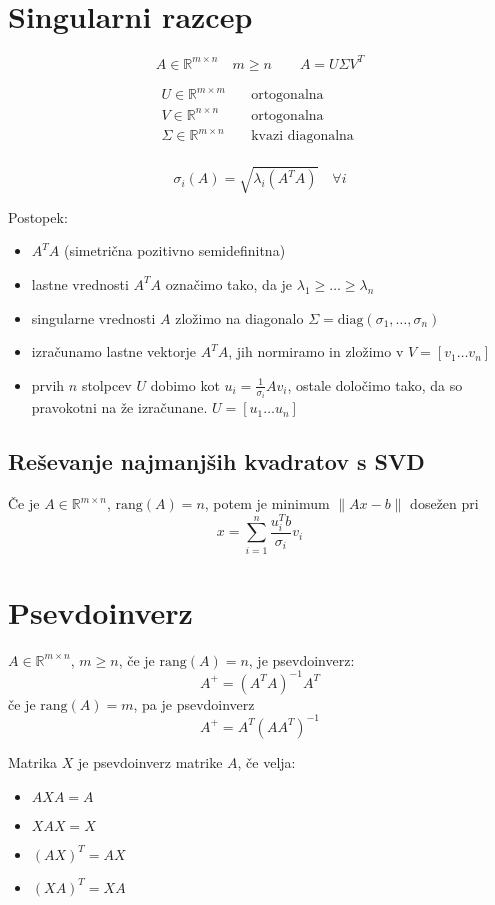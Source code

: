 \begin{multicols}{4}
\section{Singularni razcep}
\[ A \in \mathbb{R}^{m\times n} \quad m \geq n \qquad A = U \Sigma V^T\]

\begin{align*}
	U \in \mathbb{R}^{m\times m} \quad &\text{ortogonalna } \\
	V \in \mathbb{R}^{n\times n} \quad &\text{ortogonalna } \\
	\Sigma \in \mathbb{R}^{m\times n} \quad &\text{kvazi diagonalna } \\
\end{align*}

\[ \sigma_i (A) = \sqrt{\lambda_i(A^TA)} \quad \forall i\]

Postopek:
\begin{itemize}
	\item $A^TA$ (simetrična pozitivno semidefinitna)
	\item lastne vrednosti $A^TA$ označimo tako, da je $\lambda_1 \geq \dots \geq \lambda_n$
	\item singularne vrednosti $A$ zložimo na diagonalo $\Sigma = \text{diag}(\sigma_1, \dots, \sigma_n)$
	\item izračunamo lastne vektorje $A^TA$, jih normiramo in zložimo v $V = [v_1 \dots v_n]$
	\item prvih $n$ stolpcev $U$ dobimo kot $u_i = \frac{1}{\sigma_i} A v_i$, ostale določimo tako, da so pravokotni na že izračunane. $U = [u_1 \dots u_n]$
\end{itemize}

\subsection{Reševanje najmanjših kvadratov s SVD}
Če je $A \in \mathbb{R}^{m\times n}$, $\text{rang}(A) = n$, potem je minimum $\| Ax - b\|$ dosežen pri
\[ x = \sum_{i=1}^n \frac{u_i^Tb}{\sigma_i} v_i\]

\section{Psevdoinverz}
$A \in \mathbb{R}^{m\times n}$, $m \geq n$, če je $\text{rang}(A) = n$, je psevdoinverz:
\[A^+ = (A^TA)^{-1}A^T \]
če je $\text{rang}(A) = m$, pa je psevdoinverz
\[A^+ = A^T(AA^T)^{-1} \]

Matrika $X$ je psevdoinverz matrike $A$, če velja:
\begin{itemize}
	\item $AXA = A$
	\item $XAX = X$
	\item $(AX)^T=AX$
	\item $(XA)^T=XA$
\end{itemize}


\end{multicols}
